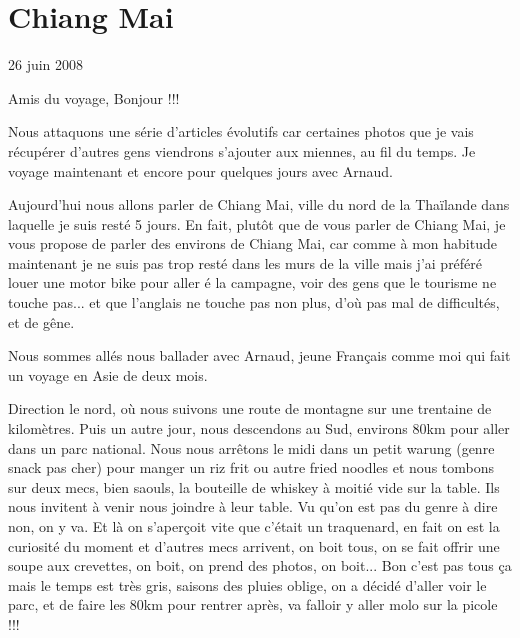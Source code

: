 \section{Chiang Mai}

26 juin 2008

\begin{multicols}{2}

Amis du voyage, Bonjour !!!

Nous attaquons une série d'articles évolutifs car certaines photos que je vais récupérer d'autres gens viendrons s'ajouter aux miennes, au fil du temps. Je voyage maintenant et encore pour quelques jours avec Arnaud.

Aujourd'hui nous allons parler de Chiang Mai, ville du nord de la Thaïlande dans laquelle je suis resté 5 jours. En fait, plutôt que de vous parler de Chiang Mai, je vous propose de parler des environs de Chiang Mai, car comme à mon habitude maintenant je ne suis pas trop resté dans les murs de la ville mais j'ai préféré louer une motor bike pour aller é la campagne, voir des gens que le tourisme ne touche pas... et que l'anglais ne touche pas non plus, d'où pas mal de difficultés, et de gêne.

Nous sommes allés nous ballader avec Arnaud, jeune Français comme moi qui fait un voyage en Asie de deux mois.

Direction le nord, où nous suivons une route de montagne sur une trentaine de kilomètres. Puis un autre jour, nous descendons au Sud, environs 80km pour aller dans un parc national. Nous nous arrêtons le midi dans un petit warung (genre snack pas cher) pour manger un riz frit ou autre fried noodles et nous tombons sur deux mecs, bien saouls, la bouteille de whiskey à moitié vide sur la table. Ils nous invitent à venir nous joindre à leur table. Vu qu'on est pas du genre à dire non, on y va. Et là on s'aperçoit vite que c'était un traquenard, en fait on est la curiosité du moment et d'autres mecs arrivent, on boit tous, on se fait offrir une soupe aux crevettes, on boit, on prend des photos, on boit... Bon c'est pas tous ça mais le temps est très gris, saisons des pluies oblige, on a décidé d'aller voir le parc, et de faire les 80km pour rentrer après, va falloir y aller molo sur la picole !!!




\end{multicols}
